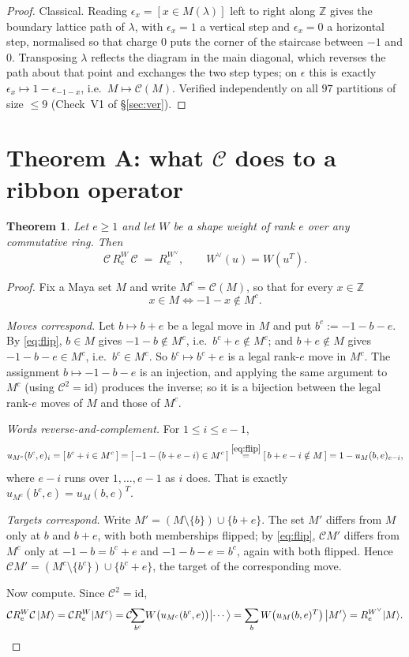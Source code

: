 \documentclass[11pt]{article}
\newtheorem{theorem}{Theorem}[section]
\theoremstyle{definition}
\theoremstyle{remark}
\newcommand{\Z}{\mathbb{Z}}
\newcommand{\Cop}{\mathcal{C}}
\begin{document}
\begin{proof}
Classical.  Reading $\epsilon_x=[x\in M(\lambda)]$ left to right along $\Z$ gives the
boundary lattice path of $\lambda$, with $\epsilon_x=1$ a vertical step and $\epsilon_x=0$
a horizontal step, normalised so that charge $0$ puts the corner of the staircase between
$-1$ and $0$.  Transposing $\lambda$ reflects the diagram in the main diagonal, which
reverses the path about that point and exchanges the two step types; on $\epsilon$ this is
exactly $\epsilon_x\mapsto 1-\epsilon_{-1-x}$, i.e.\ $M\mapsto\Cop(M)$.
Verified independently on all $97$ partitions of size $\le9$ (Check~V1 of \S\ref{sec:ver}).
\end{proof}

\section{Theorem A: what $\Cop$ does to a ribbon operator}

\begin{theorem}\label{thm:A}
Let $e\ge1$ and let $W$ be a shape weight of rank $e$ over any commutative ring.  Then
\[
   \Cop\,R_e^{W}\,\Cop \;=\; R_e^{W^\vee},\qquad W^\vee(u)=W(u^{T}).
\]
\end{theorem}

\begin{proof}
Fix a Maya set $M$ and write $M^{c}=\Cop(M)$, so that for every $x\in\Z$
\begin{equation}\label{eq:flip}
   x\in M \iff -1-x\notin M^{c}.
\end{equation}

\emph{Moves correspond.}  Let $b\mapsto b+e$ be a legal move in $M$ and put
$b^{c}:=-1-b-e$.  By \eqref{eq:flip}, $b\in M$ gives $-1-b\notin M^{c}$, i.e.\
$b^{c}+e\notin M^{c}$; and $b+e\notin M$ gives $-1-b-e\in M^{c}$, i.e.\ $b^{c}\in M^{c}$.
So $b^{c}\mapsto b^{c}+e$ is a legal rank-$e$ move in $M^{c}$.  The assignment
$b\mapsto -1-b-e$ is an injection, and applying the same argument to $M^{c}$ (using
$\Cop^{2}=\mathrm{id}$) produces the inverse; so it is a bijection between the legal
rank-$e$ moves of $M$ and those of $M^{c}$.

\emph{Words reverse-and-complement.}  For $1\le i\le e-1$,
\[
   u_{M^{c}}(b^{c},e)_i=[\,b^{c}+i\in M^{c}\,]=[\,-1-(b+e-i)\in M^{c}\,]
   \overset{\eqref{eq:flip}}{=}[\,b+e-i\notin M\,]=1-u_M(b,e)_{e-i},
\]
where $e-i$ runs over $1,\dots,e-1$ as $i$ does.  That is exactly
$u_{M^{c}}(b^{c},e)=u_M(b,e)^{T}$.

\emph{Targets correspond.}  Write $M'=(M\setminus\{b\})\cup\{b+e\}$.  The set $M'$ differs
from $M$ only at $b$ and $b+e$, with both memberships flipped; by \eqref{eq:flip}, $\Cop
M'$ differs from $M^{c}$ only at $-1-b=b^{c}+e$ and $-1-b-e=b^{c}$, again with both
flipped.  Hence $\Cop M'=(M^{c}\setminus\{b^{c}\})\cup\{b^{c}+e\}$, the target of the
corresponding move.

Now compute.  Since $\Cop^{2}=\mathrm{id}$,
\[
  \Cop R_e^{W}\Cop\,|M\rangle=\Cop R_e^{W}|M^{c}\rangle
   =\Cop\!\!\sum_{b^{c}}\! W\bigl(u_{M^{c}}(b^{c},e)\bigr)\bigl|\cdots\bigr\rangle
   =\sum_{b} W\bigl(u_M(b,e)^{T}\bigr)\,\bigl|M'\bigr\rangle
   =R_e^{W^\vee}|M\rangle. \qedhere
\]
\end{proof}
\end{document}
